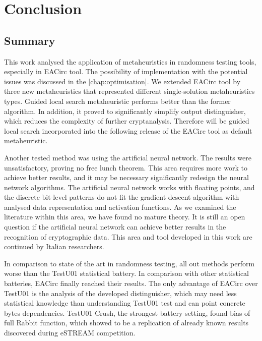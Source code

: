 \documentclass[
  print, %
  Table,   %
  nolof,     %
  nolot,     %
  11pt, %
  oneside  %
]{fithesis3}
\begin{document}

\chapter{Conclusion}
\label{chap:conclusion}

\section{Summary}
\label{sec:conclusion-summary}

This work analysed the application of metaheuristics in randomness testing tools, especially in EACirc tool. The possibility of implementation with the potential issues was discussed in the \cref{chap:optimisation}. We extended EACirc tool by three new metaheuristics that represented different single-solution metaheuristics types. Guided local search metaheuristic performs better than the former algorithm. In addition, it proved to significantly simplify output distinguisher, which reduces the complexity of further cryptanalysis. Therefore will be guided local search incorporated into the following release of the EACirc tool as default metaheuristic.

Another tested method was using the artificial neural network. The results were unsatisfactory, proving no free lunch theorem. This area requires more work to achieve better results, and it may be necessary significantly redesign the neural network algorithms. The artificial neural network works with floating points, and the discrete bit-level patterns do not fit the gradient descent algorithm with analysed data representation and activation functions. As we examined the literature within this area, we have found no mature theory. It is still an open question if the artificial neural network can achieve better results in the recognition of cryptographic data. This area and tool developed in this work are continued by Italian researchers.

In comparison to state of the art in randomness testing, all out methods perform worse than the TestU01 statistical battery. In comparison with other statistical batteries, EACirc finally reached their results. The only advantage of EACirc over TestU01 is the analysis of the developed distinguisher, which may need less statistical knowledge than understanding TestU01 test and can point concrete bytes dependencies. TestU01 Crush, the strongest battery setting, found bias of full Rabbit function, which showed to be a replication of already known results discovered during eSTREAM competition.
\end{document}
